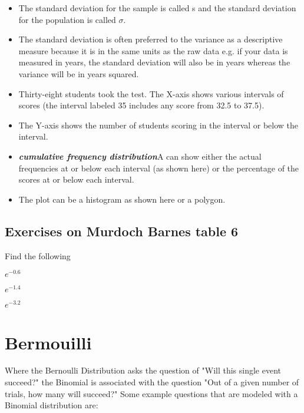 \begin{itemize}
\item The standard deviation for the sample is called s and the standard deviation for the population is called $\sigma$.
\item The standard deviation is often preferred to the variance as a descriptive measure because it is in the same units as the raw data e.g. if your data is measured in years, the standard deviation will also be in years whereas the variance will be in years squared.
\end{itemize}

\begin{itemize}
\item Thirty-eight students took the test. The X-axis shows various intervals of scores (the interval labeled 35 includes any score from 32.5 to 37.5). 
\item The Y-axis shows the number of students scoring in the interval or below the interval.

\item \textbf{\emph{cumulative frequency distribution}}A  can show either the actual frequencies at or below each interval (as shown here) or the percentage of the scores at or below each interval.
\item  The plot can be a histogram as shown here or a polygon.
\end{itemize}

\subsection{Exercises on Murdoch Barnes table 6}

Find the following

$e^{-0.6}$

$e^{-1.4}$

$e^{-3.2}$


\section{Bermouilli}

Where the Bernoulli Distribution asks the question of "Will this single event succeed?" the Binomial is associated with the question "Out of a given number of trials, how many will succeed?" Some example questions that are modeled with a Binomial distribution are:

